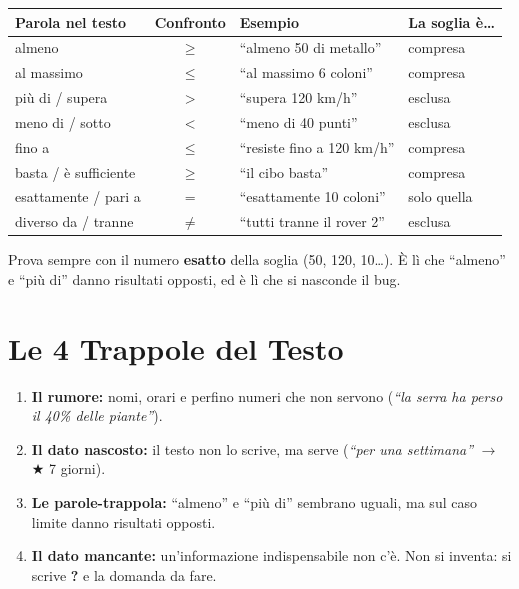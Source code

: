 \begin{center}
\renewcommand{\arraystretch}{1.4}
\begin{tabular}{|l|c|l|l|}
\hline
\rowcolor{PiazzaPrimary!15}
\textbf{Parola nel testo} & \textbf{Confronto} & \textbf{Esempio} & \textbf{La soglia è\dots} \\
\hline
almeno                & $\geq$ & ``almeno 50 di metallo''              & compresa \\
al massimo            & $\leq$ & ``al massimo 6 coloni''               & compresa \\
più di / supera       & $>$    & ``supera 120 km/h''                   & esclusa \\
meno di / sotto       & $<$    & ``meno di 40 punti''                  & esclusa \\
fino a                & $\leq$ & ``resiste fino a 120 km/h''           & compresa \\
basta / è sufficiente & $\geq$ & ``il cibo basta''                     & compresa \\
esattamente / pari a  & $=$    & ``esattamente 10 coloni''             & solo quella \\
diverso da / tranne   & $\neq$ & ``tutti tranne il rover 2''           & esclusa \\
\hline
\end{tabular}
\end{center}

\begin{attenzione}
Prova sempre con il numero \textbf{esatto} della soglia (50, 120, 10\dots). È lì che ``almeno'' e ``più di'' danno risultati opposti, ed è lì che si nasconde il bug.
\end{attenzione}

\section{Le 4 Trappole del Testo}

\begin{enumerate}
  \item \textbf{Il rumore:} nomi, orari e perfino numeri che non servono (\emph{``la serra ha perso il 40\% delle piante''}).
  \item \textbf{Il dato nascosto:} il testo non lo scrive, ma serve (\emph{``per una settimana''} $\to$ $\bigstar$ 7 giorni).
  \item \textbf{Le parole-trappola:} ``almeno'' e ``più di'' sembrano uguali, ma sul caso limite danno risultati opposti.
  \item \textbf{Il dato mancante:} un'informazione indispensabile non c'è. Non si inventa: si scrive \textbf{?} e la domanda da fare.
\end{enumerate}

